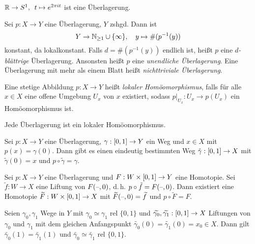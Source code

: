 \documentclass{cheat-sheet}
\newcommand{\rel}{\text{ rel }} %
\begin{document}
\begin{bsp}
  $\mathbb{R} \to S^1, \enspace t \mapsto e^{2 \pi it}$ ist eine Überlagerung.
\end{bsp}

\begin{bem}
  Sei $p : X \to Y$ eine Überlagerung, $Y$ zshgd. Dann ist
  \[ Y \to \mathbb{N}_{\geq 1} \cup \{ \infty \}, \quad y \mapsto \text{\#} (p^{-1}(y)) \]
  konstant, da lokalkonstant.
  Falls $d = \text{\#} (p^{-1}(y))$ endlich ist, heißt $p$ eine \emph{$d$-blättrige} Überlagerung. Ansonsten heißt $p$ eine \emph{unendliche Überlagerung}. Eine Überlagerung mit mehr als einem Blatt heißt \emph{nichttriviale Überlagerung}.
\end{bem}

\begin{defn}
  Eine stetige Abbildung $p : X \to Y$ heißt \emph{lokaler Homöomorphismus}, falls für alle $x \in X$ eine offene Umgebung $U_x$ von $x$ existiert, sodass $p|_{U_x} : U_x \to p(U_x)$ ein Homöomorphismus ist.
\end{defn}

\begin{lem}
  Jede Überlagerung ist ein lokaler Homöomorphismus.
\end{lem}

\begin{prop}
  Sei $p : X \to Y$ eine Überlagerung, $\gamma : \left[ 0, 1 \right] \to Y$ ein Weg und $x \in X$ mit $p(x) = \gamma(0)$. Dann gibt es einen eindeutig bestimmten Weg $\tilde{\gamma} : \left[ 0, 1 \right] \to X$ mit $\tilde{\gamma}(0) = x$ und $p \circ \tilde{\gamma} = \gamma$.
\end{prop}


\begin{satz}
  Sei $p : X \to Y$ eine Überlagerung und $F : W \times \left[ 0, 1 \right] \to Y$ eine Homotopie. Sei $\tilde{f} : W \to X$ eine Liftung von $F(\text{--}, 0)$, d.\,h. $p \circ \tilde{f} = F(\text{--}, 0)$. Dann existiert eine Homotopie $\widetilde{F} : W \times \left[ 0, 1 \right] \to X$ mit $\widetilde{F}(\text{--}, 0) = \widetilde{f}$ und $p \circ \widetilde{F} = F$.
\end{satz}

\begin{kor}
  Seien $\gamma_0, \gamma_1$ Wege in $Y$ mit $\gamma_0 \simeq \gamma_1 \rel \{ 0, 1 \}$ und $\widetilde{\gamma_0}, \widetilde{\gamma_1} : \left[ 0, 1 \right] \to X$ Liftungen von $\gamma_0$ und $\gamma_1$ mit dem gleichen Anfangspunkt $\widetilde{\gamma_0}(0) = \widetilde{\gamma_1}(0) = x_0 \in X$. Dann gilt $\widetilde{\gamma_0}(1) = \widetilde{\gamma_1}(1)$ und $\widetilde{\gamma_0} \simeq \widetilde{\gamma_1} \rel \{ 0, 1 \}$.
\end{kor}
\end{document}
